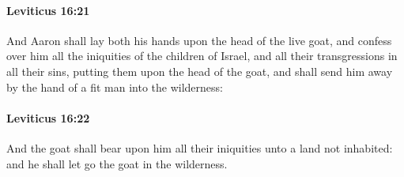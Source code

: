 		\paragraph{Leviticus 16:21} %
			\label{LEVITICUS-16-21}

			And Aaron shall lay both his hands upon the head of the live goat, and confess over him all the iniquities of the children of Israel, and all their transgressions in all their sins, putting them upon the head of the goat, and shall send him away by the hand of a fit man into the wilderness:


		\paragraph{Leviticus 16:22} %
			\label{LEVITICUS-16-22}

			And the goat shall bear upon him all their iniquities unto a land not inhabited: and he shall let go the goat in the wilderness.

